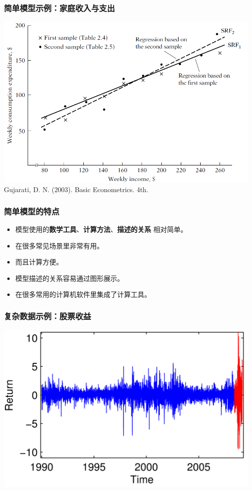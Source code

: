 \documentclass[11pt]{beamer}
\begin{document}
\begin{frame}
  \frametitle{简单模型示例：家庭收入与支出}
  \centering \includegraphics[height=0.8\textheight]{family_income_sample_line}\\

  \tiny{Gujarati, D. N. (2003). Basic Econometrics. 4th.}
\end{frame}

\begin{frame}
  \frametitle{简单模型的特点}
  \begin{itemize}
  \item 模型使用的\textbf{数学工具}、\textbf{计算方法}、\textbf{描述的关系} 相对简单。
  \item 在很多常见场景里非常有用。
  \item 而且计算方便。
  \item 模型描述的关系容易通过图形展示。
  \item 在很多常用的计算机软件里集成了计算工具。
  \end{itemize}

\end{frame}

\begin{frame}
  \frametitle{复杂数据示例：股票收益}
    \centering \includegraphics[height=0.8\textheight]{return}
\end{frame}
\end{document}
